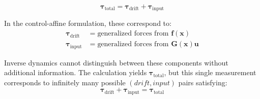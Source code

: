 \documentclass[11pt,a4paper]{article}
\newcommand{\bvec}[1]{\mathbf{#1}}
\theoremstyle{definition}
\theoremstyle{plain}
\begin{document}
\begin{equation}
\bvec{\tau}_{\text{total}} = \bvec{\tau}_{\text{drift}} + \bvec{\tau}_{\text{input}}
\end{equation}

In the control-affine formulation, these correspond to:
\begin{align}
\bvec{\tau}_{\text{drift}} &= \text{generalized forces from } \bvec{f}(\bvec{x}) \\
\bvec{\tau}_{\text{input}} &= \text{generalized forces from } \bvec{G}(\bvec{x})\bvec{u}
\end{align}

\begin{limitation}
Inverse dynamics cannot distinguish between these components without additional information. The calculation yields $\bvec{\tau}_{\text{total}}$, but this single measurement corresponds to infinitely many possible $(drift, input)$ pairs satisfying:
\begin{equation}
\bvec{\tau}_{\text{drift}} + \bvec{\tau}_{\text{input}} = \bvec{\tau}_{\text{total}}
\end{equation}
\end{limitation}
\end{document}
